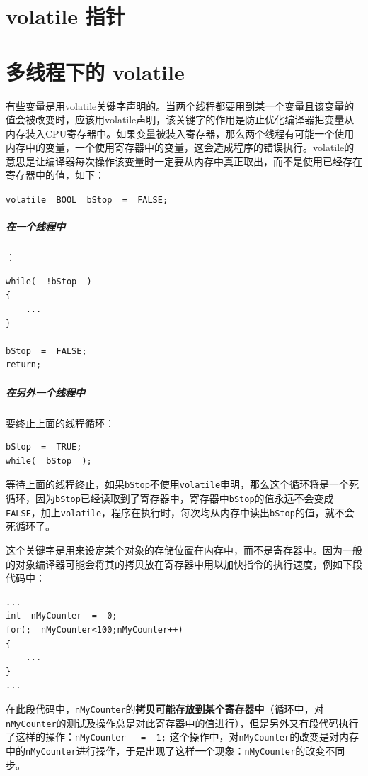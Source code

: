 \documentclass[UTF8,a4paper,12pt]{ctexbook} %
\begin{document}
	\section{volatile 指针}
	
	
	\section{多线程下的 volatile}
		有些变量是用volatile关键字声明的。当两个线程都要用到某一个变量且该变量的值会被改变时，应该用volatile声明，该关键字的作用是防止优化编译器把变量从内存装入CPU寄存器中。如果变量被装入寄存器，那么两个线程有可能一个使用内存中的变量，一个使用寄存器中的变量，这会造成程序的错误执行。volatile的意思是让编译器每次操作该变量时一定要从内存中真正取出，而不是使用已经存在寄存器中的值，如下： 
		
		  \verb|volatile  BOOL  bStop  =  FALSE;  |
		  
		  \subparagraph{在一个线程中}：
		  		\begin{lstlisting}
while(  !bStop  )  
{
	... 
}  

bStop  =  FALSE;  
return; 	
	  		\end{lstlisting}  
   
		  
		  \subparagraph{在另外一个线程中} 要终止上面的线程循环：  
		  		\begin{lstlisting}
bStop  =  TRUE;  
while(  bStop  ); 
		  		\end{lstlisting}
		  		
		   等待上面的线程终止，如果\verb|bStop|不使用\verb|volatile|申明，那么这个循环将是一个死循环，因为\verb|bStop|已经读取到了寄存器中，寄存器中\verb|bStop|的值永远不会变成\verb|FALSE|，加上\verb|volatile|，程序在执行时，每次均从内存中读出\verb|bStop|的值，就不会死循环了。
		   
		   这个关键字是用来设定某个对象的存储位置在内存中，而不是寄存器中。因为一般的对象编译器可能会将其的拷贝放在寄存器中用以加快指令的执行速度，例如下段代码中：  
		   		\begin{lstlisting}
...  
int  nMyCounter  =  0;  
for(;  nMyCounter<100;nMyCounter++)  
{  
	...  
}  
...  
		   		\end{lstlisting}
		  
		   在此段代码中，\verb|nMyCounter|的\textbf{拷贝可能存放到某个寄存器中}（循环中，对\verb|nMyCounter|的测试及操作总是对此寄存器中的值进行），但是另外又有段代码执行了这样的操作：\verb|nMyCounter  -=  1;|
		   这个操作中，对\verb|nMyCounter|的改变是对内存中的\verb|nMyCounter|进行操作，于是出现了这样一个现象：\verb|nMyCounter|的改变不同步。
			
\end{document}
